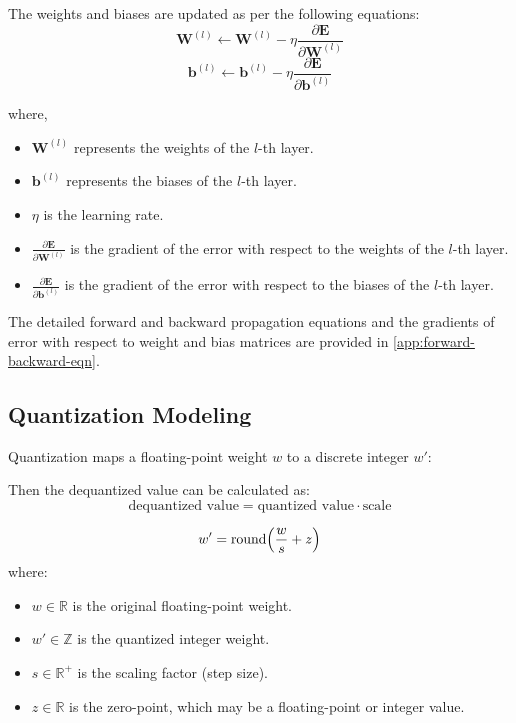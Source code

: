\documentclass{ioereport}
\begin{document}
The weights and biases are updated as per the following equations:
\begin{equation}
    \mathbf{W}^{(l)} \leftarrow \mathbf{W}^{(l)} - \eta \frac{\partial \mathbf{E}}{\partial \mathbf{W}^{(l)}}  
\end{equation}
\begin{equation}
    \mathbf{b}^{(l)} \leftarrow \mathbf{b}^{(l)} - \eta \frac{\partial \mathbf{E}}{\partial \mathbf{b}^{(l)}}  
\end{equation}

where,
\begin{itemize}
    \item \( \mathbf{W}^{(l)} \) represents the weights of the \( l \)-th layer.
    \item \( \mathbf{b}^{(l)} \) represents the biases of the \( l \)-th layer.
    \item \( \eta \) is the learning rate.
    \item \( \frac{\partial \mathbf{E}}{\partial \mathbf{W}^{(l)}} \) is the gradient of the error with respect to the weights of the \( l \)-th layer.
    \item \( \frac{\partial \mathbf{E}}{\partial \mathbf{b}^{(l)}} \) is the gradient of the error with respect to the biases of the \( l \)-th layer.
\end{itemize}

The detailed forward and backward propagation equations and the gradients of error with respect to weight and bias matrices are provided in \autoref{app:forward-backward-eqn}.


\subsection{Quantization Modeling}
Quantization maps a floating-point weight \( w \) to a discrete integer \( w' \):


Then the dequantized value can be calculated as:
\begin{equation}
\text{dequantized value} = \text{quantized value} \cdot \text{scale}
\end{equation}



\begin{equation}
w' = \text{round}\Bigl(\frac{w}{s} + z\Bigr)
\label{eq:quantization_mapping}
\end{equation}
where:
\begin{itemize}
    \item \( w \in \mathbb{R} \) is the original floating-point weight.
    \item \( w' \in \mathbb{Z} \) is the quantized integer weight.
    \item \( s \in \mathbb{R}^+ \) is the scaling factor (step size).
    \item \( z \in \mathbb{R} \) is the zero-point, which may be a floating-point or integer value.
\end{itemize}
\end{document}
